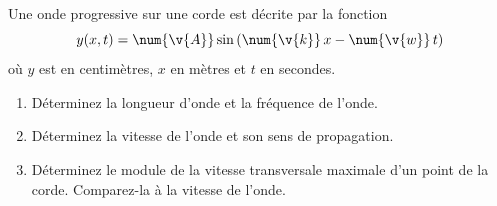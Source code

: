 Une onde progressive sur une corde est décrite par la fonction
\[ y(x,t) = \num{\v{A}}\sin\left(\num{\v{k}}\,x - \num{\v{w}}\,t\right) \]
où $y$ est en centimètres, $x$ en mètres et $t$ en secondes.

\begin{enumerate}[label=\alph*)]
    \item Déterminez la longueur d'onde et la fréquence de l'onde.
    \item Déterminez la vitesse de l'onde et son sens de propagation.
    \item Déterminez le module de la vitesse transversale maximale d'un point de la corde. Comparez-la à la vitesse de l'onde.
\end{enumerate}

